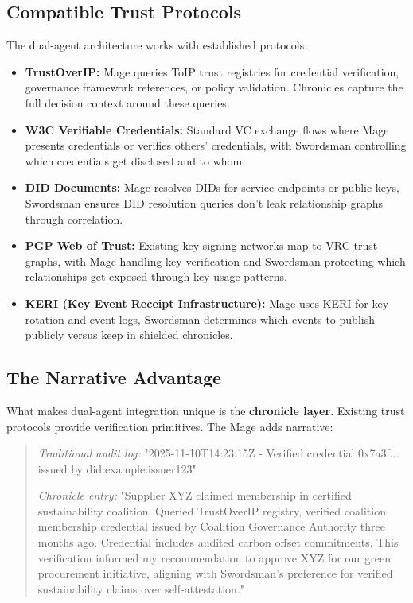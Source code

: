 \documentclass[11pt,a4paper]{article}
\theoremstyle{definition}
\begin{document}
\subsection{Compatible Trust Protocols}

The dual-agent architecture works with established protocols:

\begin{itemize}
    \item \textbf{TrustOverIP:} Mage queries ToIP trust registries for credential verification, governance framework references, or policy validation. Chronicles capture the full decision context around these queries.
    \item \textbf{W3C Verifiable Credentials:} Standard VC exchange flows where Mage presents credentials or verifies others' credentials, with Swordsman controlling which credentials get disclosed and to whom.
    \item \textbf{DID Documents:} Mage resolves DIDs for service endpoints or public keys, Swordsman ensures DID resolution queries don't leak relationship graphs through correlation.
    \item \textbf{PGP Web of Trust:} Existing key signing networks map to VRC trust graphs, with Mage handling key verification and Swordsman protecting which relationships get exposed through key usage patterns.
    \item \textbf{KERI (Key Event Receipt Infrastructure):} Mage uses KERI for key rotation and event logs, Swordsman determines which events to publish publicly versus keep in shielded chronicles.
\end{itemize}

\subsection{The Narrative Advantage}

What makes dual-agent integration unique is the \textbf{chronicle layer}. Existing trust protocols provide verification primitives. The Mage adds narrative:

\begin{quote}
\textit{Traditional audit log:} "2025-11-10T14:23:15Z - Verified credential 0x7a3f... issued by did:example:issuer123"

\textit{Chronicle entry:} "Supplier XYZ claimed membership in certified sustainability coalition. Queried TrustOverIP registry, verified coalition membership credential issued by Coalition Governance Authority three months ago. Credential includes audited carbon offset commitments. This verification informed my recommendation to approve XYZ for our green procurement initiative, aligning with Swordsman's preference for verified sustainability claims over self-attestation."
\end{quote}
\end{document}
